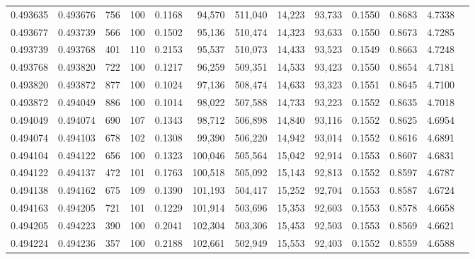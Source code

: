 \begin{tabular}{rrrrrrrrrrrrr}
0.493635 & 0.493676 &   756 & 100 &                                     0.1168 &  94,570 & 511,040 &  14,223 &  93,733 & 0.1550 & 0.8683 & 4.7338 \\
0.493677 & 0.493739 &   566 & 100 &                                     0.1502 &  95,136 & 510,474 &  14,323 &  93,633 & 0.1550 & 0.8673 & 4.7285 \\
0.493739 & 0.493768 &   401 & 110 &                                     0.2153 &  95,537 & 510,073 &  14,433 &  93,523 & 0.1549 & 0.8663 & 4.7248 \\
0.493768 & 0.493820 &   722 & 100 &                                     0.1217 &  96,259 & 509,351 &  14,533 &  93,423 & 0.1550 & 0.8654 & 4.7181 \\
0.493820 & 0.493872 &   877 & 100 &                                     0.1024 &  97,136 & 508,474 &  14,633 &  93,323 & 0.1551 & 0.8645 & 4.7100 \\
0.493872 & 0.494049 &   886 & 100 &                                     0.1014 &  98,022 & 507,588 &  14,733 &  93,223 & 0.1552 & 0.8635 & 4.7018 \\
0.494049 & 0.494074 &   690 & 107 &                                     0.1343 &  98,712 & 506,898 &  14,840 &  93,116 & 0.1552 & 0.8625 & 4.6954 \\
0.494074 & 0.494103 &   678 & 102 &                                     0.1308 &  99,390 & 506,220 &  14,942 &  93,014 & 0.1552 & 0.8616 & 4.6891 \\
0.494104 & 0.494122 &   656 & 100 &                                     0.1323 & 100,046 & 505,564 &  15,042 &  92,914 & 0.1553 & 0.8607 & 4.6831 \\
0.494122 & 0.494137 &   472 & 101 &                                     0.1763 & 100,518 & 505,092 &  15,143 &  92,813 & 0.1552 & 0.8597 & 4.6787 \\
0.494138 & 0.494162 &   675 & 109 &                                     0.1390 & 101,193 & 504,417 &  15,252 &  92,704 & 0.1553 & 0.8587 & 4.6724 \\
0.494163 & 0.494205 &   721 & 101 &                                     0.1229 & 101,914 & 503,696 &  15,353 &  92,603 & 0.1553 & 0.8578 & 4.6658 \\
0.494205 & 0.494223 &   390 & 100 &                                     0.2041 & 102,304 & 503,306 &  15,453 &  92,503 & 0.1553 & 0.8569 & 4.6621 \\
0.494224 & 0.494236 &   357 & 100 &                                     0.2188 & 102,661 & 502,949 &  15,553 &  92,403 & 0.1552 & 0.8559 & 4.6588 \\

\end{tabular}
